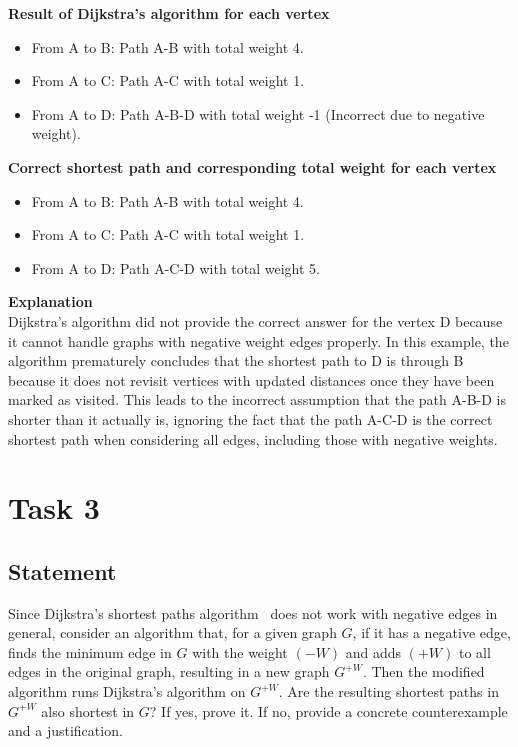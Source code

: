 \documentclass{article}
\begin{document}
\textbf{Result of Dijkstra's algorithm for each vertex}

\begin{itemize}
    \item From A to B: Path A-B with total weight 4.
    \item From A to C: Path A-C with total weight 1.
    \item From A to D: Path A-B-D with total weight -1 (Incorrect due to negative weight).
\end{itemize}

\textbf{Correct shortest path and corresponding total weight for each vertex}

\begin{itemize}
    \item From A to B: Path A-B with total weight 4.
    \item From A to C: Path A-C with total weight 1.
    \item From A to D: Path A-C-D with total weight 5.
\end{itemize}

\textbf{Explanation} \\

Dijkstra's algorithm did not provide the correct answer for the vertex D because it cannot handle graphs with negative weight edges properly. In this example, the algorithm prematurely concludes that the shortest path to D is through B because it does not revisit vertices with updated distances once they have been marked as visited. This leads to the incorrect assumption that the path A-B-D is shorter than it actually is, ignoring the fact that the path A-C-D is the correct shortest path when considering all edges, including those with negative weights.

\section{Task 3}
\subsection{Statement}

Since Dijkstra's shortest paths algorithm~\cite[\S 22.3]{cormen} does not work with negative edges in general, consider an algorithm that, for a given graph \(G\), if it has a negative edge, finds the minimum edge in \(G\) with the weight \((-W)\) and adds \((+W)\) to all edges in the original graph, resulting in a new graph \(G^{+W}\). Then the modified algorithm runs Dijkstra's algorithm on \(G^{+W}\). Are the resulting shortest paths in \(G^{+W}\) also shortest in \(G\)? If yes, prove it. If no, provide a concrete counterexample and a justification.
\end{document}
